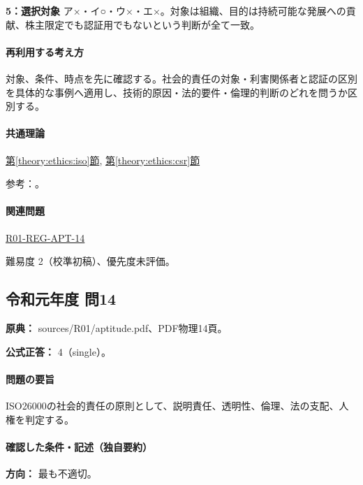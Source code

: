 \noindent\textbf{5：選択対象} ア×・イ○・ウ×・エ×。対象は組織、目的は持続可能な発展への貢献、株主限定でも認証用でもないという判断が全て一致。\par

\paragraph{再利用する考え方} 対象、条件、時点を先に確認する。社会的責任の対象・利害関係者と認証の区別を具体的な事例へ適用し、技術的原因・法的要件・倫理的判断のどれを問うか区別する。

\paragraph{共通理論} \hyperref[theory:ethics:iso]{第\ref*{theory:ethics:iso}節}, \hyperref[theory:ethics:csr]{第\ref*{theory:ethics:csr}節}

\par 参考：\cite{iso26000,iso26000_project2010}。

\paragraph{関連問題} \hyperref[q:r01-reg-apt-14]{R01-REG-APT-14}

\par 難易度 2（校準初稿）、優先度未評価。

\subsection{令和元年度 問14}
\label{q:r01-reg-apt-14}

\noindent\textbf{原典：} sources/R01/aptitude.pdf、PDF物理14頁。

\textbf{公式正答：} 4（single）。

\paragraph{問題の要旨} ISO26000の社会的責任の原則として、説明責任、透明性、倫理、法の支配、人権を判定する。

\paragraph{確認した条件・記述（独自要約）}\mbox{}\par

\noindent\textbf{方向：} 最も不適切。\par

